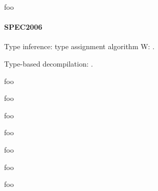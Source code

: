 \documentclass[10pt, a4paper, sigplan, authordraft]{acmart}
\begin{document}
foo



\paragraph{SPEC2006}


Type inference: type assignment algorithm W: \cite{milner_algorithmw}.

Type-based decompilation: \cite{mycroft_type_based_decompilation}.


foo \cite{tie_reverse_engineering_of_types}

foo \cite{scalable_type_detection}

foo \cite{bintype}

foo \cite{type_inference_on_executables}

foo \cite{dynstruct}

foo \cite{polymorphic_type_inference_for_machine_code}



\clearpage

foo

\clearpage



%
\end{document}
